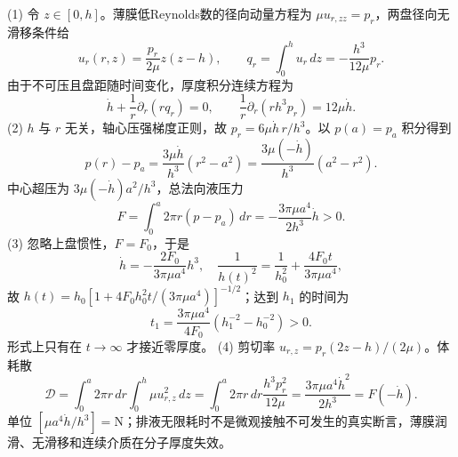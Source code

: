 (1) 令 \(z\in[0,h]\)。薄膜低Reynolds数的径向动量方程为 \(\mu u_{r,zz}=p_r\)，两盘径向无滑移条件给
\[
u_r(r,z)=\frac{p_r}{2\mu}z(z-h),\qquad
q_r=\int_0^h u_r\,dz=-\frac{h^3}{12\mu}p_r.
\]
由于不可压且盘距随时间变化，厚度积分连续方程为
\[
\dot h+\frac1r\partial_r(rq_r)=0,\qquad
\frac1r\partial_r(rh^3p_r)=12\mu\dot h.
\]
(2) \(h\) 与 \(r\) 无关，轴心压强梯度正则，故 \(p_r=6\mu\dot h\,r/h^3\)。以 \(p(a)=p_a\) 积分得到
\[
p(r)-p_a=\frac{3\mu\dot h}{h^3}(r^2-a^2)
=\frac{3\mu(-\dot h)}{h^3}(a^2-r^2).
\]
中心超压为 \(3\mu(-\dot h)a^2/h^3\)，总法向液压力
\[
F=\int_0^a2\pi r(p-p_a)\,dr
=-\frac{3\pi\mu a^4}{2h^3}\dot h>0.
\]
(3) 忽略上盘惯性，\(F=F_0\)，于是
\[
\dot h=-\frac{2F_0}{3\pi\mu a^4}h^3,\quad
\frac1{h(t)^2}=\frac1{h_0^2}+\frac{4F_0t}{3\pi\mu a^4},
\]
故 \(h(t)=h_0[1+4F_0h_0^2t/(3\pi\mu a^4)]^{-1/2}\)；达到 \(h_1\) 的时间为
\[
t_1=\frac{3\pi\mu a^4}{4F_0}(h_1^{-2}-h_0^{-2})>0.
\]
形式上只有在 \(t\to\infty\) 才接近零厚度。
(4) 剪切率 \(u_{r,z}=p_r(2z-h)/(2\mu)\)。体耗散
\[
\mathcal D=\int_0^a 2\pi r\,dr\int_0^h\mu u_{r,z}^2\,dz
=\int_0^a2\pi r\,dr\frac{h^3p_r^2}{12\mu}
=\frac{3\pi\mu a^4\dot h^2}{2h^3}=F(-\dot h).
\]
单位 \([\mu a^4\dot h/h^3]=\mathrm N\)；排液无限耗时不是微观接触不可发生的真实断言，薄膜润滑、无滑移和连续介质在分子厚度失效。
